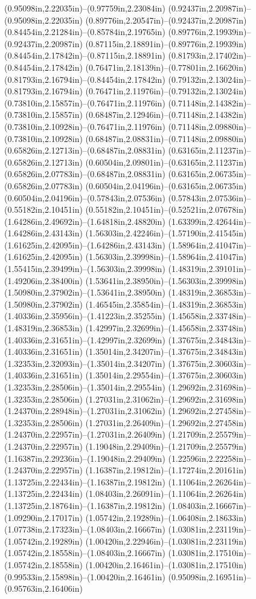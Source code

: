 (0.95098in,2.22035in)--(0.97759in,2.23084in) (0.92437in,2.20987in)--(0.95098in,2.22035in) (0.89776in,2.20547in)--(0.92437in,2.20987in) (0.84454in,2.21284in)--(0.85784in,2.19765in) (0.89776in,2.19939in)--(0.92437in,2.20987in) (0.87115in,2.18891in)--(0.89776in,2.19939in) (0.84454in,2.17842in)--(0.87115in,2.18891in) (0.81793in,2.17402in)--(0.84454in,2.17842in) (0.76471in,2.18139in)--(0.77801in,2.16620in) (0.81793in,2.16794in)--(0.84454in,2.17842in) (0.79132in,2.13024in)--(0.81793in,2.16794in) (0.76471in,2.11976in)--(0.79132in,2.13024in) (0.73810in,2.15857in)--(0.76471in,2.11976in) (0.71148in,2.14382in)--(0.73810in,2.15857in) (0.68487in,2.12946in)--(0.71148in,2.14382in) (0.73810in,2.10928in)--(0.76471in,2.11976in) (0.71148in,2.09880in)--(0.73810in,2.10928in) (0.68487in,2.08831in)--(0.71148in,2.09880in) (0.65826in,2.12713in)--(0.68487in,2.08831in) (0.63165in,2.11237in)--(0.65826in,2.12713in) (0.60504in,2.09801in)--(0.63165in,2.11237in) (0.65826in,2.07783in)--(0.68487in,2.08831in) (0.63165in,2.06735in)--(0.65826in,2.07783in) (0.60504in,2.04196in)--(0.63165in,2.06735in) (0.60504in,2.04196in)--(0.57843in,2.07536in) (0.57843in,2.07536in)--(0.55182in,2.10451in) (0.55182in,2.10451in)--(0.52521in,2.07678in) (1.64286in,2.49692in)--(1.64818in,2.48820in) (1.63399in,2.42644in)--(1.64286in,2.43143in) (1.56303in,2.42246in)--(1.57190in,2.41545in) (1.61625in,2.42095in)--(1.64286in,2.43143in) (1.58964in,2.41047in)--(1.61625in,2.42095in) (1.56303in,2.39998in)--(1.58964in,2.41047in) (1.55415in,2.39499in)--(1.56303in,2.39998in) (1.48319in,2.39101in)--(1.49206in,2.38400in) (1.53641in,2.38950in)--(1.56303in,2.39998in) (1.50980in,2.37902in)--(1.53641in,2.38950in) (1.48319in,2.36853in)--(1.50980in,2.37902in) (1.46545in,2.35854in)--(1.48319in,2.36853in) (1.40336in,2.35956in)--(1.41223in,2.35255in) (1.45658in,2.33748in)--(1.48319in,2.36853in) (1.42997in,2.32699in)--(1.45658in,2.33748in) (1.40336in,2.31651in)--(1.42997in,2.32699in) (1.37675in,2.34843in)--(1.40336in,2.31651in) (1.35014in,2.34207in)--(1.37675in,2.34843in) (1.32353in,2.32093in)--(1.35014in,2.34207in) (1.37675in,2.30603in)--(1.40336in,2.31651in) (1.35014in,2.29554in)--(1.37675in,2.30603in) (1.32353in,2.28506in)--(1.35014in,2.29554in) (1.29692in,2.31698in)--(1.32353in,2.28506in) (1.27031in,2.31062in)--(1.29692in,2.31698in) (1.24370in,2.28948in)--(1.27031in,2.31062in) (1.29692in,2.27458in)--(1.32353in,2.28506in) (1.27031in,2.26409in)--(1.29692in,2.27458in) (1.24370in,2.22957in)--(1.27031in,2.26409in) (1.21709in,2.25579in)--(1.24370in,2.22957in) (1.19048in,2.29409in)--(1.21709in,2.25579in) (1.16387in,2.29236in)--(1.19048in,2.29409in) (1.22596in,2.22258in)--(1.24370in,2.22957in) (1.16387in,2.19812in)--(1.17274in,2.20161in) (1.13725in,2.22434in)--(1.16387in,2.19812in) (1.11064in,2.26264in)--(1.13725in,2.22434in) (1.08403in,2.26091in)--(1.11064in,2.26264in) (1.13725in,2.18764in)--(1.16387in,2.19812in) (1.08403in,2.16667in)--(1.09290in,2.17017in) (1.05742in,2.19289in)--(1.06408in,2.18633in) (1.07738in,2.17323in)--(1.08403in,2.16667in) (1.03081in,2.23119in)--(1.05742in,2.19289in) (1.00420in,2.22946in)--(1.03081in,2.23119in) (1.05742in,2.18558in)--(1.08403in,2.16667in) (1.03081in,2.17510in)--(1.05742in,2.18558in) (1.00420in,2.16461in)--(1.03081in,2.17510in) (0.99533in,2.15898in)--(1.00420in,2.16461in) (0.95098in,2.16951in)--(0.95763in,2.16406in) 